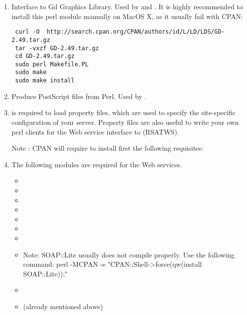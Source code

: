 \begin{enumerate}
\item {} Interface to Gd Graphics Library. Used by
   and . It is highly recommended to install this perl module manually on MacOS X, as it usually fail with CPAN: 
  
  \begin{lstlisting}
 curl -O  http://search.cpan.org/CPAN/authors/id/L/LD/LDS/GD-2.49.tar.gz
 tar -vxzf GD-2.49.tar.gz
 cd GD-2.49.tar.gz
 sudo perl Makefile.PL
 sudo make
 sudo make install
\end{lstlisting}

\item {} Produce PostScript files from
  Perl. Used by .

\item {} is required to load property files,
  which are used to specify the site-specific configuration of your
  \RSAT server. Property files are also useful to write your own perl
  clients for the Web service interface to \RSAT (RSATWS).
  
  Note : CPAN will require to install first the following requisites:
  
  
  
  

\item 
  The following modules are required for the Web services. 

  \begin{itemize}
    \item {}
    \item {}
    \item {}
    \item {}
    \item {}
    \item {}
    \item {} 
    \item {}
    Note: SOAP::Lite usually does not compile properly. Use the following command:
    perl -MCPAN -e "CPAN::Shell->force(qw(install SOAP::Lite));"
    \item {}
    \item {} (already mentioned above) 
  \end{itemize}


\end{enumerate}
